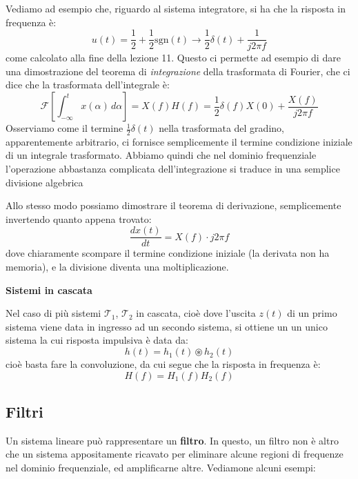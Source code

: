 \documentclass[a4paper,11pt]{article}
\begin{document}
\par\smallskip

Vediamo ad esempio che, riguardo al sistema integratore, si ha che la risposta in frequenza è:
$$
u(t) = \frac{1}{2} + \frac{1}{2} \mathrm{sgn}(t) \rightarrow \frac{1}{2} \delta(t) + \frac{1}{j 2 \pi f}
$$
come calcolato alla fine della lezione 11. Questo ci permette ad esempio di dare una dimostrazione del teorema di \textit{integrazione} della trasformata di Fourier, che ci dice che la trasformata dell'integrale è:
$$
\mathcal{F} \left[ \int_{-\infty}^t x(\alpha) \, d\alpha \right] = X(f) H(f) = \frac{1}{2} \delta(f) X(0) + \frac{X(f)}{j 2 \pi f}
$$
Osserviamo come il termine $\frac{1}{2}\delta(t)$ nella trasformata del gradino, apparentemente arbitrario, ci fornisce semplicemente il termine condizione iniziale di un integrale trasformato. Abbiamo quindi che nel dominio frequenziale l'operazione abbastanza complicata dell'integrazione si traduce in una semplice divisione algebrica

\par\smallskip

Allo stesso modo possiamo dimostrare il teorema di derivazione, semplicemente invertendo quanto appena trovato:
$$
\frac{d x(t)}{dt} = X(f) \cdot j 2 \pi f
$$
dove chiaramente scompare il termine condizione iniziale (la derivata non ha memoria), e la divisione diventa una moltiplicazione.

\par\smallskip

\noindent
\textbf{\textsf{Sistemi in cascata}}

\noindent
Nel caso di più sistemi $\mathcal{T}_1$, $\mathcal{T}_2$ in cascata, cioè dove l'uscita $z(t)$ di un primo sistema viene data in ingresso ad un secondo sistema, si ottiene un un unico sistema la cui risposta impulsiva è data da:
$$
h(t) = h_1(t) \circledast h_2(t)
$$
cioè basta fare la convoluzione, da cui segue che la risposta in frequenza è:
$$
H(f) = H_1(f) H_2(f)
$$

\subsection{Filtri}
Un sistema lineare può rappresentare un \textbf{filtro}. In questo, un filtro non è altro che un sistema appositamente ricavato per eliminare alcune regioni di frequenze nel dominio frequenziale, ed amplificarne altre. Vediamone alcuni esempi:
\end{document}
